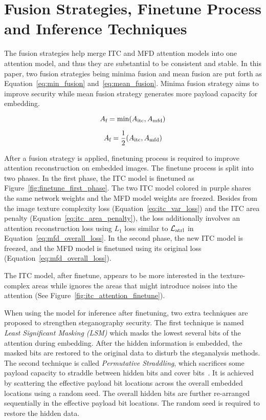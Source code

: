 \section{Fusion Strategies, Finetune Process and Inference Techniques}

The fusion strategies help merge ITC and MFD attention models into one attention model, and thus they are substantial to be consistent and stable. In this paper, two fusion strategies being minima fusion and mean fusion are put forth as Equation~\ref{eq:min_fusion} and~\ref{eq:mean_fusion}. Minima fusion strategy aims to improve security while mean fusion strategy generates more payload capacity for embedding.

\begin{equation}
  A_{\text{f}} = \min(A_{\text{itc}}, A_{\text{mfd}})
  \label{eq:min_fusion}
\end{equation}

\begin{equation}
  A_{\text{f}} = \frac{1}{2}(A_{\text{itc}}, A_{\text{mfd}})
  \label{eq:mean_fusion}
\end{equation}

After a fusion strategy is applied, finetuning process is required to improve attention reconstruction on embedded images. The finetune process is split into two phases. In the first phase, the ITC model is finetuned as Figure~\ref{fig:finetune_first_phase}. The two ITC model colored in purple shares the same network weights and the MFD model weights are freezed. Besides from the image texture complexity loss (Equation~\ref{eq:itc_var_loss}) and the ITC area penalty (Equation~\ref{eq:itc_area_penalty}), the loss additionally involves an attention reconstruction loss using \(L_1\) loss similar to \( \mathcal{L}_\mathrm{atrl} \) in Equation~\ref{eq:mfd_overall_loss}. In the second phase, the new ITC model is freezed, and the MFD model is finetuned using its original loss (Equation~\ref{eq:mfd_overall_loss}).

\figureFinetuneFirstPhase%

The ITC model, after finetune, appears to be more interested in the texture-complex areas while ignores the areas that might introduce noises into the attention (See Figure~\ref{fig:itc_attention_finetune}).

\figureItcAttentionFinetune%

When using the model for inference after finetuning, two extra techniques are proposed to strengthen steganography security. The first technique is named \textit{Least Significant Masking (LSM)} which masks the lowest several bits of the attention during embedding. After the hidden information is embedded, the masked bits are restored to the original data to disturb the steganalysis methods. The second technique is called \textit{Permutative Straddling}, which sacrifices some payload capacity to straddle between hidden bits and cover bits~\cite{F5Stego}. It is achieved by scattering the effective payload bit locations across the overall embedded locations using a random seed. The overall hidden bits are further re-arranged sequentially in the effective payload bit locations. The random seed is required to restore the hidden data.
